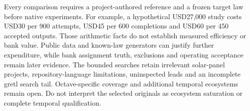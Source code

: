 Every comparison requires a project-authored reference and a frozen target law before native experiments. For example, a hypothetical USD27,000 study costs USD30 per 900 attempts, USD45 per 600 completions and USD60 per 450 accepted outputs. Those arithmetic facts do not establish measured efficiency or bank value. Public data and known-law generators can justify further expenditure, while bank assignment truth, exclusions and operating acceptance remain later evidence. The bounded searches retain irrelevant solar-panel projects, repository-language limitations, uninspected leads and an incomplete gretl search tail. Octave-specific coverage and additional temporal ecosystems remain open. Do not interpret the selected originals as ecosystem saturation or complete temporal qualification.\citep{exec25_odyn_choice}
